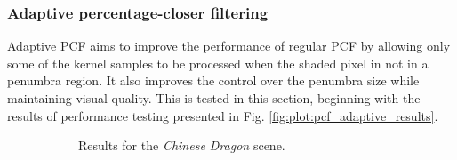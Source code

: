 \subsubsection{Adaptive percentage-closer filtering}
Adaptive PCF aims to improve the performance of regular PCF by allowing only some of the kernel samples to be processed when the shaded pixel in not in a penumbra region. It also improves the control over the penumbra size while maintaining visual quality. This is tested in this section, beginning with the results of performance testing presented in Fig. \ref{fig:plot:pcf_adaptive_results}.

\begin{figure}[h]
    \centering
    \begin{subfigure}[t]{0.48\textwidth}
        \caption{Results for the \textit{Chinese Dragon} scene.}
        \label{fig:plot:pcf_adaptive_dragon}
    \end{subfigure}
    \hfill
    \begin{subfigure}[t]{0.48\textwidth}

\end{subfigure}
\end{figure}
